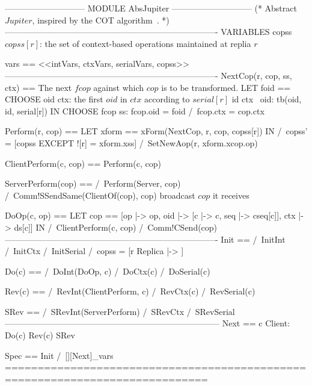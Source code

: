 \documentclass{article}
\begin{document}
\begin{tla}
----------------------------- MODULE AbsJupiter -----------------------------
(*
Abstract $Jupiter$, inspired by the COT algorithm~\cite{Sun:TPDS09}.
*)
----------------------------------------------------------------------------
VARIABLES copss \* $copss[r]$: the set of context-based operations maintained at replia $r$

vars == <<intVars, ctxVars, serialVars, copss>>
----------------------------------------------------------------------------
NextCop(r, cop, ss, ctx) == \* The next $fcop$ against which $cop$ is to be transformed.
    LET foid == CHOOSE oid \in ctx: \* the first $oid$ in $ctx$ according to $serial[r]$
                    \A id \in ctx \ {oid}: tb(oid, id, serial[r])
    IN  CHOOSE fcop \in ss: fcop.oid = foid /\ fcop.ctx = cop.ctx 

Perform(r, cop) ==
    LET xform == xForm(NextCop, r, cop, copss[r])
    IN  /\ copss' = [copss EXCEPT ![r] = xform.xss]
        /\ SetNewAop(r, xform.xcop.op)
        
ClientPerform(c, cop) == Perform(c, cop)
        
ServerPerform(cop) == 
    /\ Perform(Server, cop)
    /\ Comm!SSendSame(ClientOf(cop), cop) \* broadcast $cop$ it receives

DoOp(c, op) ==
    LET cop == [op |-> op, oid |-> [c |-> c, seq |-> cseq[c]], ctx |-> ds[c]]
    IN  /\ ClientPerform(c, cop)
        /\ Comm!CSend(cop) 
----------------------------------------------------------------------------
Init ==
    /\ InitInt
    /\ InitCtx
    /\ InitSerial
    /\ copss = [r \in Replica |-> {}]

Do(c) == 
    /\ DoInt(DoOp, c)
    /\ DoCtx(c)
    /\ DoSerial(c)

Rev(c) ==
    /\ RevInt(ClientPerform, c)
    /\ RevCtx(c)
    /\ RevSerial(c)

SRev ==
    /\ SRevInt(ServerPerform)
    /\ SRevCtx
    /\ SRevSerial
-----------------------------------------------------------------------------
Next ==
    \/ \E c \in Client: Do(c) \/ Rev(c)
    \/ SRev

Spec == Init /\ [][Next]_vars
=============================================================================
\end{tla}
\end{document}
